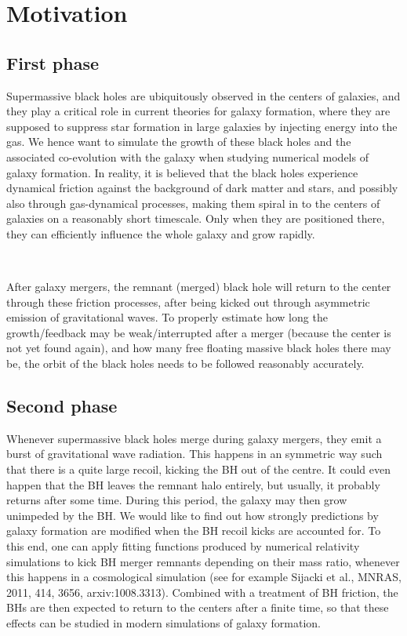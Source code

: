 \documentclass[a4,useAMS,usenatbib,usegraphicx,12pt]{article}
\begin{document}
\newpage

\section{Motivation}

\subsection{First phase}

Supermassive black holes are ubiquitously observed in the centers of galaxies, 
and they play a critical role in current theories for galaxy formation, where 
they are supposed to suppress star formation in large galaxies by injecting 
energy into the gas. We hence want to simulate the growth of these black holes 
and the associated co-evolution with the galaxy when studying numerical models 
of galaxy formation. In reality, it is believed that the black holes experience 
dynamical friction against the background of dark matter and stars, and possibly 
also through gas-dynamical processes, making them spiral in to the centers of 
galaxies on a reasonably short timescale. Only when they are positioned there, 
they can efficiently influence the whole galaxy and grow rapidly. 

\

After galaxy mergers, the remnant (merged) black hole will return to the center 
through these friction processes, after being kicked out through asymmetric 
emission of gravitational waves. To properly estimate how long the growth/feedback 
may be weak/interrupted after a merger (because the center is not yet found again), 
and how many free floating massive black holes there may be, the orbit of the 
black holes needs to be followed reasonably accurately.

\subsection{Second phase}

Whenever supermassive black holes merge during galaxy mergers, they emit
a burst of gravitational wave radiation. This happens in an symmetric way such that there
is a quite large recoil, kicking the BH out of the centre. It could even happen that the BH
leaves the remnant halo entirely, but usually, it probably returns after some time. During
this period, the galaxy may then grow unimpeded by the BH. We would like to find out
how strongly predictions by galaxy formation are modified when the BH recoil kicks are
accounted for. To this end, one can apply fitting functions produced by numerical relativity
simulations to kick BH merger remnants depending on their mass ratio, whenever this
happens in a cosmological simulation (see for example Sijacki et al., MNRAS, 2011, 414,
3656, arxiv:1008.3313). Combined with a treatment of BH friction, the BHs are then
expected to return to the centers after a finite time, so that these effects can be studied in
modern simulations of galaxy formation.
\end{document}
